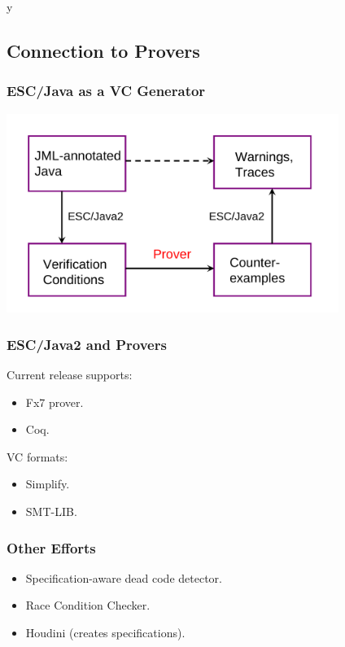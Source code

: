 \if y\MAKEHANDOUTS \documentclass[t,compress,landscape,handout]{beamer}
\begin{document}
\subsection[Provers]{Connection to Provers}

\begin{frame}
\frametitle{ESC/Java as a VC Generator}
\includegraphics[width=4.25in]{escarch}
\end{frame}

\begin{frame}
\frametitle{ESC/Java2 and Provers}
Current release supports:
\begin{itemize}
\item
Fx7 prover.

\item
Coq.
\end{itemize}

VC formats:
\begin{itemize}
\item
Simplify.

\item
SMT-LIB.
\end{itemize}
\end{frame}

\begin{frame}
\frametitle{Other Efforts}
\begin{itemize}
\item
Specification-aware dead code detector.

\item
Race Condition Checker.

\item
Houdini (creates specifications).
\end{itemize}
\end{frame}
\end{document}
